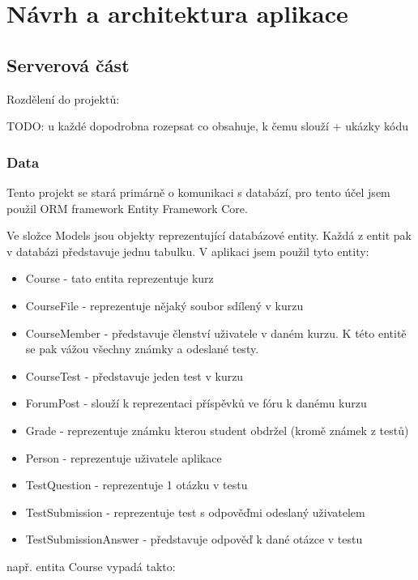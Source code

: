 \chapter{Návrh a architektura aplikace}

\section{Serverová část}

Rozdělení do projektů:

TODO: u každé dopodrobna rozepsat co obsahuje, k čemu slouží + ukázky kódu

\subsection{Data}

Tento projekt se stará primárně o komunikaci s databází, pro tento účel jsem použil ORM framework Entity Framework Core. 

Ve složce Models jsou objekty reprezentující databázové entity. Každá z entit pak v databázi představuje jednu tabulku. V aplikaci jsem použil tyto entity:

\begin{itemize}
	\item Course - tato entita reprezentuje kurz
	\item CourseFile - reprezentuje nějaký soubor sdílený v kurzu
	\item CourseMember - představuje členství uživatele v daném kurzu. K této entitě se pak vážou všechny známky a odeslané testy.
	\item CourseTest - představuje jeden test v kurzu
	\item ForumPost - slouží k reprezentaci příspěvků ve fóru k danému kurzu
	\item Grade - reprezentuje známku kterou student obdržel (kromě známek z testů)
	\item Person - reprezentuje uživatele aplikace
	\item TestQuestion - reprezentuje 1 otázku v testu
	\item TestSubmission - reprezentuje test s odpověďmi odeslaný uživatelem
	\item TestSubmissionAnswer - představuje odpověď k dané otázce v testu
\end{itemize}

např. entita Course vypadá takto:


